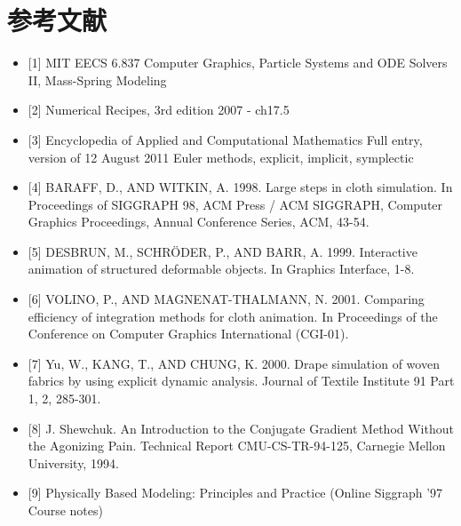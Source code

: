 \documentclass[UTF8]{ctexart}
\begin{document}
\section{参考文献}

\begin{small}
\begin{itemize}
\item{[1]} MIT EECS 6.837 Computer Graphics, Particle Systems
and ODE Solvers II,
Mass-Spring Modeling
\item{[2]} Numerical Recipes, 3rd edition 2007 - ch17.5
\item{[3]} Encyclopedia of Applied and Computational Mathematics
Full entry, version of 12 August 2011
Euler methods, explicit, implicit, symplectic
\item{[4]} BARAFF, D., AND WITKIN, A. 1998. Large steps in cloth simulation. In Proceedings of SIGGRAPH 98, ACM Press / ACM SIGGRAPH, Computer Graphics Proceedings, Annual Conference Series, ACM, 43-54.
\item{[5]} DESBRUN, M., SCHRÖDER, P., AND BARR, A. 1999. Interactive animation of structured deformable objects. In Graphics Interface, 1-8.
\item{[6]} VOLINO, P., AND MAGNENAT-THALMANN, N. 2001. Comparing efficiency of integration methods for cloth animation. In Proceedings of the Conference on Computer Graphics International (CGI-01). 
\item{[7]} Yu, W., KANG, T., AND CHUNG, K. 2000. Drape simulation of woven fabrics by using explicit dynamic analysis. Journal of Textile Institute 91 Part 1, 2, 285-301.
\item{[8]} J. Shewchuk. An Introduction to the Conjugate Gradient Method Without the Agonizing Pain. Technical Report CMU-CS-TR-94-125, Carnegie Mellon University, 1994.
\item{[9]} Physically Based Modeling: Principles and Practice (Online Siggraph '97 Course notes)
\end{itemize}
\end{small}
\end{document}
